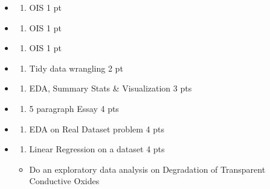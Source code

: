 \documentclass[
]{article}
\providecommand{\tightlist}{%
  \setlength{\itemsep}{0pt}\setlength{\parskip}{0pt}}
\begin{document}
\begin{itemize}
\item
  \begin{enumerate}
  \def\labelenumi{\arabic{enumi}.}
  \tightlist
  \item
    OIS 1 pt
  \end{enumerate}
\item
  \begin{enumerate}
  \def\labelenumi{\arabic{enumi}.}
  \setcounter{enumi}{1}
  \tightlist
  \item
    OIS 1 pt
  \end{enumerate}
\item
  \begin{enumerate}
  \def\labelenumi{\arabic{enumi}.}
  \setcounter{enumi}{2}
  \tightlist
  \item
    OIS 1 pt
  \end{enumerate}
\item
  \begin{enumerate}
  \def\labelenumi{\arabic{enumi}.}
  \setcounter{enumi}{3}
  \tightlist
  \item
    Tidy data wrangling 2 pt
  \end{enumerate}
\item
  \begin{enumerate}
  \def\labelenumi{\arabic{enumi}.}
  \setcounter{enumi}{4}
  \tightlist
  \item
    EDA, Summary Stats \& Visualization 3 pts
  \end{enumerate}
\item
  \begin{enumerate}
  \def\labelenumi{\arabic{enumi}.}
  \setcounter{enumi}{5}
  \tightlist
  \item
    5 paragraph Essay 4 pts
  \end{enumerate}
\item
  \begin{enumerate}
  \def\labelenumi{\arabic{enumi}.}
  \setcounter{enumi}{6}
  \tightlist
  \item
    EDA on Real Dataset problem 4 pts
  \end{enumerate}
\item
  \begin{enumerate}
  \def\labelenumi{\arabic{enumi}.}
  \setcounter{enumi}{7}
  \tightlist
  \item
    Linear Regression on a dataset 4 pts
  \end{enumerate}

  \begin{itemize}
  \tightlist
  \item
    Do an exploratory data analysis on Degradation of Transparent
    Conductive Oxides
  \end{itemize}
\end{itemize}
\end{document}
